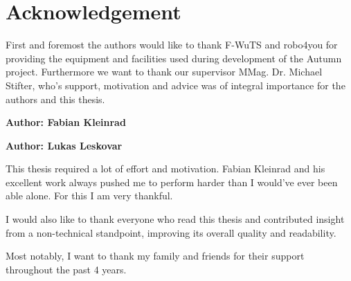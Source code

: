 \chapter{Acknowledgement}

First and foremost the authors would like to thank F-WuTS and robo4you for providing the equipment and facilities used during development of the Autumn project. Furthermore we want to thank our supervisor MMag. Dr. Michael Stifter, who's support, motivation and advice was of integral importance for the authors and this thesis.\linebreak

\textbf{Author: Fabian Kleinrad }

\textbf{Author: Lukas Leskovar}

This thesis required a lot of effort and motivation. Fabian Kleinrad and his excellent work always pushed me to perform harder than I would've ever been able alone. For this I am very thankful. 

I would also like to thank everyone who read this thesis and contributed insight from a non-technical standpoint, improving its overall quality and readability. 

Most notably, I want to thank my family and friends for their support throughout the past 4 years. 